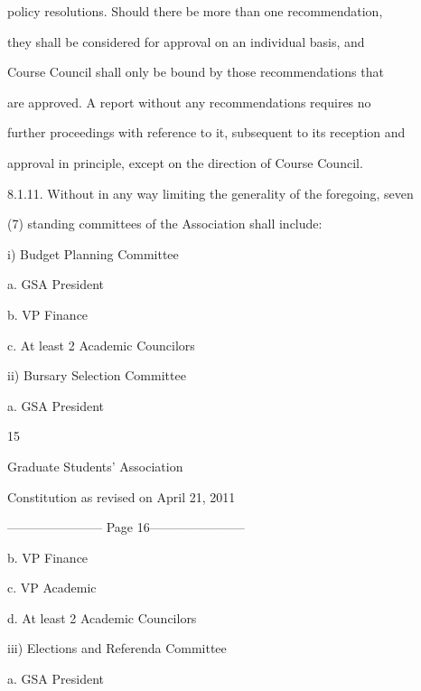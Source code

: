 \documentclass{article}
\begin{document}
policy  resolutions.  Should  there  be  more  than  one  recommendation,  

they  shall  be  considered  for  approval  on  an  individual  basis,  and  

Course  Council  shall  only  be  bound  by  those  recommendations  that  

are  approved.  A  report  without  any  recommendations  requires  no  

further proceedings with reference to it, subsequent to its reception and  

approval in principle, except on the direction of Course Council.  



8.1.11.     Without in any way limiting the generality of the foregoing, seven   

(7) standing committees of the Association shall include:  



i)      Budget Planning Committee  



a.  GSA President  



b.  VP Finance  



c.  At least 2 Academic Councilors  



ii)     Bursary Selection Committee  



a.  GSA President  



 

      15  



       Graduate Students’ Association  



  Constitution as revised on April 21, 2011  


----------------------- Page 16-----------------------

b.  VP Finance  



c.  VP Academic  



d.  At least 2 Academic Councilors  



iii)    Elections and Referenda Committee  



a.  GSA President  
\end{document}
